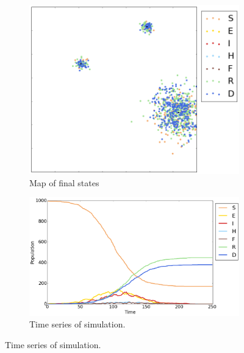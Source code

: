 

\begin{figure}
\centering
\begin{subfigure}[t]{0.38\textwidth}
  \includegraphics[width=\textwidth]{map} 
  \caption{Map of final states}
\end{subfigure}
\begin{subfigure}[t]{0.56\textwidth}
  \includegraphics[width=\textwidth]{time}
  \caption{Time series of simulation.}
\end{subfigure}

\end{figure}

